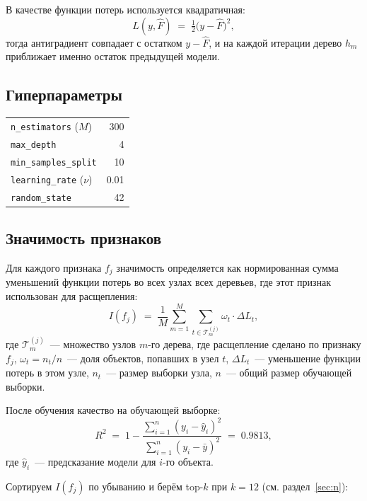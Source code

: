 \documentclass[12pt,a4paper]{article}
\begin{document}
В качестве функции потерь используется квадратичная:
\begin{equation}
  L(y, \hat{F}) \;=\; \tfrac{1}{2}\bigl(y - \hat{F}\bigr)^2,
\end{equation}
тогда антиградиент совпадает с остатком $y - \hat{F}$, и на каждой
итерации дерево $h_m$ приближает именно остаток предыдущей модели.

\subsection{Гиперпараметры}
\begin{center}
\begin{tabular}{lr}
\toprule
\texttt{n\_estimators} ($M$)      & 300  \\
\texttt{max\_depth}               & 4    \\
\texttt{min\_samples\_split}      & 10   \\
\texttt{learning\_rate} ($\nu$)   & 0.01 \\
\texttt{random\_state}            & 42   \\
\bottomrule
\end{tabular}
\end{center}

\subsection{Значимость признаков}
Для каждого признака $f_j$ значимость определяется как нормированная
сумма уменьшений функции потерь во всех узлах всех деревьев, где этот
признак использован для расщепления:
\begin{equation}
  I(f_j) \;=\; \frac{1}{M}\sum_{m=1}^{M}\sum_{t \in \mathcal{T}_m^{(j)}}
                 \omega_t \cdot \Delta L_t,
  \label{eq:fimp}
\end{equation}
где $\mathcal{T}_m^{(j)}$~--- множество узлов $m$-го дерева, где
расщепление сделано по признаку $f_j$, $\omega_t = n_t/n$~--- доля
объектов, попавших в узел $t$, $\Delta L_t$~--- уменьшение функции
потерь в этом узле, $n_t$~--- размер выборки узла, $n$~--- общий размер
обучающей выборки.

После обучения качество на обучающей выборке:
\[
  R^2 \;=\; 1 - \frac{\sum_{i=1}^{n}(y_i - \hat{y}_i)^2}{\sum_{i=1}^{n}(y_i - \bar{y})^2}
        \;=\; 0.9813,
\]
где $\hat{y}_i$~--- предсказание модели для $i$-го объекта.

Сортируем $I(f_j)$ по убыванию и берём top-$k$ при $k=12$ (см.
раздел~\ref{sec:n}):
\end{document}
